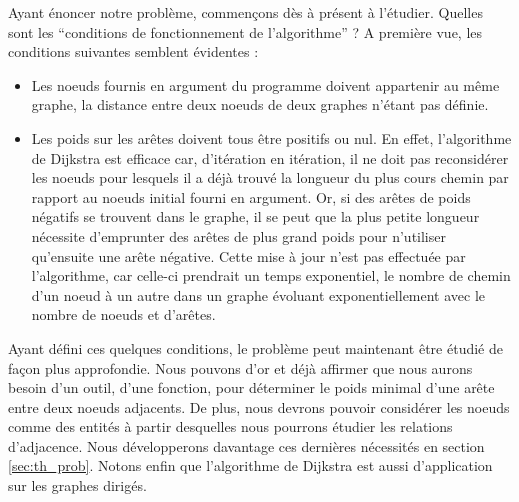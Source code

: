 Ayant énoncer notre problème, commençons dès à présent à l'étudier. Quelles sont les ``conditions de fonctionnement de l'algorithme'' ? A première vue, les conditions suivantes semblent évidentes :
\begin{itemize}
	\item Les noeuds fournis en argument du programme doivent appartenir au même graphe, la distance entre deux noeuds de deux graphes n'étant pas définie.
	\item Les poids sur les arêtes doivent tous être positifs ou nul. En effet, l'algorithme de Dijkstra est efficace car, d'itération en itération, il ne doit pas reconsidérer les noeuds pour lesquels il a déjà trouvé la longueur du plus cours chemin par rapport au noeuds initial fourni en argument. Or, si des arêtes de poids négatifs se trouvent dans le graphe, il se peut que la plus petite longueur nécessite d'emprunter des arêtes de plus grand poids pour n'utiliser qu'ensuite une arête négative. Cette mise à jour n'est pas effectuée par l'algorithme, car celle-ci prendrait un temps exponentiel, le nombre de chemin d'un noeud à un autre dans un graphe évoluant exponentiellement avec le nombre de noeuds et d'arêtes.
\end{itemize}

Ayant défini ces quelques conditions, le problème peut maintenant être étudié de façon plus approfondie. Nous pouvons d'or et déjà affirmer que nous aurons besoin d'un outil, d'une fonction, pour déterminer le poids minimal d'une arête entre deux noeuds adjacents. De plus, nous devrons pouvoir considérer les noeuds comme des entités à partir desquelles nous pourrons étudier les relations d'adjacence. Nous développerons davantage ces dernières nécessités en section \ref{sec:th_prob}. Notons enfin que l'algorithme de Dijkstra est aussi d'application sur les graphes dirigés.
